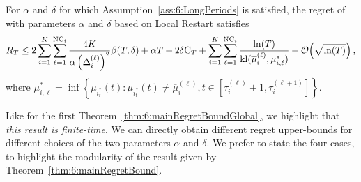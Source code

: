 \begin{theorem}\label{thm:6:mainRegretBound}
\begin{leftbar}[theorembar]  %
    For $\alpha$ and $\delta$ for which Assumption~\ref{ass:6:LongPeriods} is satisfied, the regret of \GLRklUCB{} with parameters $\alpha$ and $\delta$ based on Local Restart satisfies
    \begin{equation}
        R_T \leq 2\sum_{i=1}^K\sum_{\ell=1}^{\text{NC}_i} \frac{4K}{\alpha \left(\Delta_i^{(\ell)}\right)^2}\beta(T,\delta) +\alpha T + 2 \delta \mathrm{C}_T  + \sum_{i=1}^K\sum_{\ell=1}^{\text{NC}_i} \frac{\ln(T)}{\mathrm{kl}(\overline{\mu}_i^{(\ell)},{\mu}^*_{i,\ell})} +\mathop{}\mathopen{}\mathcal{O}\mathopen{}\left(\sqrt{\ln(T)}\right),
    \end{equation}
    where ${\mu}^*_{i,\ell} = \inf \left\{ \mu_{i_t^*}(t) : \mu_{i_t^*}(t) \neq \overline{\mu}_i^{(\ell)}, t \in [\tau_i^{(\ell)}+1, \tau_i^{(\ell+1)}]\right\}$.
\end{leftbar}  %
\end{theorem}

Like for the first Theorem~\ref{thm:6:mainRegretBoundGlobal},
we highlight that \emph{this result is finite-time}.
%
We can directly obtain different regret upper-bounds for different choices of the two parameters $\alpha$ and $\delta$.
We prefer to state the four cases, to highlight the modularity of the result given by Theorem~\ref{thm:6:mainRegretBound}.

